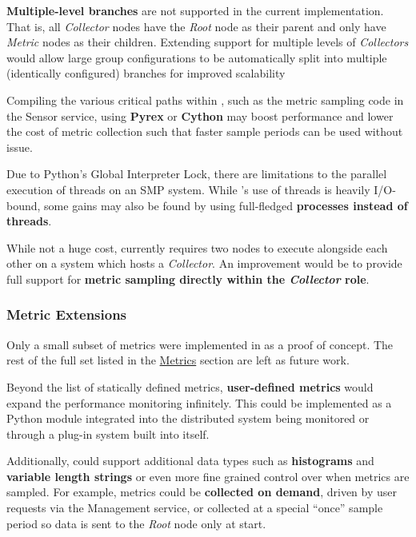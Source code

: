 \textbf{Multiple-level branches} are not supported in the current implementation. That is, all \textit{Collector} nodes
have the \textit{Root} node as their parent and only have \textit{Metric} nodes as their children. Extending support for
multiple levels of \textit{Collectors} would allow large group configurations to be automatically split into multiple
(identically configured) branches for improved scalability

Compiling the various critical paths within \dcampns, such as the metric sampling code in the Sensor service, using
\textbf{Pyrex}\cite{pyrex} or \textbf{Cython}\cite{cython} may boost performance and lower the cost of metric collection
such that faster sample periods can be used without issue.

Due to Python's Global Interpreter Lock\cite{py-threads}, there are limitations to the parallel execution of threads on
an SMP system. While \dcampns's use of threads is heavily I/O-bound, some gains may also be found by using full-fledged
\textbf{processes instead of threads}.

While not a huge cost, \dcamp currently requires two nodes to execute alongside each other on a system which hosts a
\textit{Collector}. An improvement would be to provide full support for \textbf{metric sampling directly within the
\textit{Collector} role}.

\subsubsection{Metric Extensions}
\label{metric_extensions}

Only a small subset of metrics were implemented in \dcamp as a proof of concept. The rest of the full set listed in the
\hyperref[dcamp_metrics]{\dcamp Metrics} section are left as future work.

Beyond the list of statically defined metrics, \textbf{user-defined metrics} would expand the performance monitoring
infinitely. This could be implemented as a Python module integrated into the distributed system being monitored or
through a plug-in system built into \dcamp itself.

Additionally, \dcamp could support additional data types such as \textbf{histograms} and \textbf{variable length
strings} or even more fine grained control over when metrics are sampled. For example, metrics could be
\textbf{collected on demand}, driven by user requests via the Management service, or collected at a special ``once''
sample period so data is sent to the \textit{Root} node only at start.

